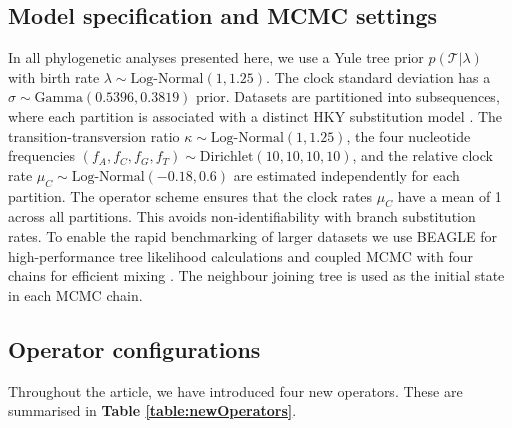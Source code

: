 \documentclass[10pt,letterpaper]{article}
\begin{document}
\clearpage
\subsection*{Model specification and MCMC settings} \label{sect:methods}

In all phylogenetic analyses presented here, we use a Yule \cite{yule1925ii} tree prior $p(\mathcal{T}|\lambda)$ with birth rate $\lambda \sim \text{Log-Normal}(1,1.25)$. %
The clock standard deviation has a $\sigma \sim \text{Gamma}(0.5396,0.3819)$ prior.
Datasets are partitioned into subsequences, where each partition is associated with a distinct HKY substitution model \cite{hasegawa1985dating}.
The transition-transversion ratio $\kappa \sim \text{Log-Normal}(1, 1.25)$, the four nucleotide frequencies $(f_A, f_C, f_G, f_T) \sim \text{Dirichlet}(10,10,10,10)$, and the relative clock rate $\mu_C \sim \text{Log-Normal}(-0.18, 0.6)$ are estimated independently for each partition.
The operator scheme ensures that the clock rates $\mu_C$ have a mean of 1 across all partitions. 
This avoids non-identifiability with branch substitution rates.
To enable the rapid benchmarking of larger datasets we use BEAGLE for high-performance tree likelihood calculations \cite{ayres2012beagle} and coupled MCMC with four chains for efficient mixing \cite{muller2019coupled}.
The neighbour joining tree \cite{saitou1987neighbor} is used as the initial state in each MCMC chain.



\subsection*{Operator configurations} \label{sect:operatorSchemes}


Throughout the article, we have introduced four new operators. 
These are summarised in \textbf{Table \ref{table:newOperators}}.
\end{document}

